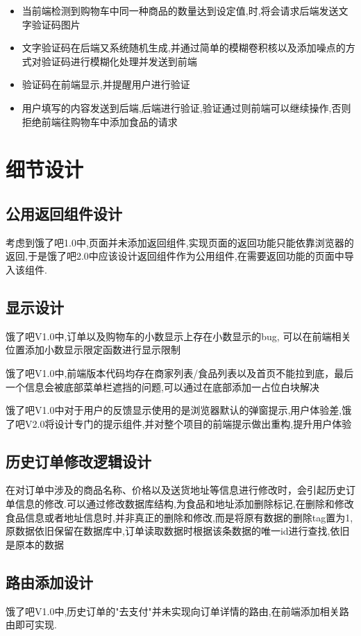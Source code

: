 \begin{itemize}
    \item 当前端检测到购物车中同一种商品的数量达到设定值,时,将会请求后端发送文字验证码图片
    \item 文字验证码在后端又系统随机生成,并通过简单的模糊卷积核以及添加噪点的方式对验证码进行模糊化处理并发送到前端
    \item 验证码在前端显示,并提醒用户进行验证
    \item 用户填写的内容发送到后端,后端进行验证,验证通过则前端可以继续操作,否则拒绝前端往购物车中添加食品的请求
\end{itemize}



\section{细节设计}
\subsection{公用返回组件设计}
考虑到饿了吧1.0中,页面并未添加返回组件,实现页面的返回功能只能依靠浏览器的返回,于是饿了吧2.0中应该设计返回组件作为公用组件,在需要返回功能的页面中导入该组件.

\subsection{显示设计}
饿了吧V1.0中,订单以及购物车的小数显示上存在小数显示的bug, 可以在前端相关位置添加小数显示限定函数进行显示限制

饿了吧V1.0中,前端版本代码均存在商家列表/⻝品列表以及首页不能拉到底，最后⼀个信息会被底部菜单栏遮挡的问题,可以通过在底部添加一占位白块解决

饿了吧V1.0中对于用户的反馈显示使用的是浏览器默认的弹窗提示,用户体验差,饿了吧V2.0将设计专门的提示组件,并对整个项目的前端提示做出重构,提升用户体验

\subsection{历史订单修改逻辑设计}在对订单中涉及的商品名称、价格以及送货地址等信息进行修改时，会引起历史订单信息的修改.可以通过修改数据库结构,为食品和地址添加删除标记,在删除和修改食品信息或者地址信息时,并非真正的删除和修改,而是将原有数据的删除tag置为1,原数据依旧保留在数据库中,订单读取数据时根据该条数据的唯一id进行查找,依旧是原本的数据

\subsection{路由添加设计}
饿了吧V1.0中,历史订单的"去支付"并未实现向订单详情的路由,在前端添加相关路由即可实现.

